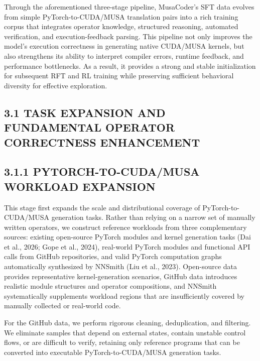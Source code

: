 \documentclass[
  10
]{article}
\begin{document}
Through the aforementioned three-stage pipeline, MusaCoder's SFT data
evolves from simple PyTorch-to-CUDA/MUSA translation pairs into a rich
training corpus that integrates operator knowledge, structured
reasoning, automated verification, and execution-feedback parsing. This
pipeline not only improves the model's execution correctness in
generating native CUDA/MUSA kernels, but also strengthens its ability to
interpret compiler errors, runtime feedback, and performance
bottlenecks. As a result, it provides a strong and stable initialization
for subsequent RFT and RL training while preserving sufficient
behavioral diversity for effective exploration.

\subsection{3.1 TASK EXPANSION AND FUNDAMENTAL OPERATOR CORRECTNESS
ENHANCEMENT}\label{task-expansion-and-fundamental-operator-correctness-enhancement}

\subsection{3.1.1 PYTORCH-TO-CUDA/MUSA WORKLOAD
EXPANSION}\label{pytorch-to-cudamusa-workload-expansion}

This stage first expands the scale and distributional coverage of
PyTorch-to-CUDA/MUSA generation tasks. Rather than relying on a narrow
set of manually written operators, we construct reference workloads from
three complementary sources: existing open-source PyTorch modules and
kernel generation tasks (Dai et al., 2026; Gope et al., 2024),
real-world PyTorch modules and functional API calls from GitHub
repositories, and valid PyTorch computation graphs automatically
synthesized by NNSmith (Liu et al., 2023). Open-source data provides
representative kernel-generation scenarios, GitHub data introduces
realistic module structures and operator compositions, and NNSmith
systematically supplements workload regions that are insufficiently
covered by manually collected or real-world code.

For the GitHub data, we perform rigorous cleaning, deduplication, and
filtering. We eliminate samples that depend on external states, contain
unstable control flows, or are difficult to verify, retaining only
reference programs that can be converted into executable
PyTorch-to-CUDA/MUSA generation tasks.
\end{document}

